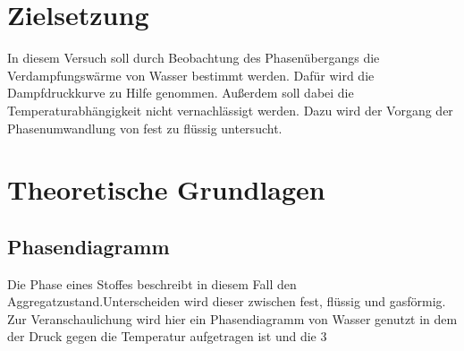 \section{Zielsetzung}

In diesem Versuch soll durch Beobachtung des Phasenübergangs die 
Verdampfungswärme von Wasser bestimmt werden. Dafür wird die Dampfdruckkurve zu Hilfe genommen.
Außerdem soll dabei die Temperaturabhängigkeit nicht vernachlässigt werden.
Dazu wird der Vorgang der Phasenumwandlung von fest zu flüssig untersucht.
\section{Theoretische Grundlagen}

\subsection{Phasendiagramm}

Die \glqq Phase\grqq{} eines Stoffes beschreibt in diesem Fall den Aggregatzustand.Unterscheiden wird dieser zwischen fest, 
flüssig und gasförmig. 
Zur Veranschaulichung wird hier ein Phasendiagramm von Wasser genutzt in dem der Druck gegen die Temperatur aufgetragen ist und die 3 


